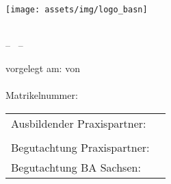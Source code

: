 \thispagestyle{empty}
\begingroup
{}
\begin{titlepage}
\begin{spacing}{1} %

	
	\vspace{1cm}
	\begin{center}
		\texttt{[image: assets/img/logo\_basn]} \\ 
	\end{center}

	\begin{center}
		\vspace{0.1cm}
		\LARGE \textbf{\myAcademy}\\
		\vspace{0.4cm}
		\Large -- \myStudy\ --
	\end{center}

	\vfill


	\vfill

	\begin{center}
		\Large \textbf{\myTitle}
		\ifdef{\mySubtitle}{\vspace{0.2cm}\\ \normalsize \mySubtitle}{}
	\end{center} 

	\vfill

	\begin{center}
		\large \myDegree
	\end{center}

	\vfill

	\begin{center}
		\large vorgelegt am: {\mySubmissionDate} von\\
		\vspace{0.3cm}
		\large \textbf{\myName}\\
		\vspace{0.3cm}
		\footnotesize Matrikelnummer: \myId
	\end{center}

	\vfill
	\vfill

	\begin{center}
		\begin{tabular}{ll}
		  Ausbildender Praxispartner:   & \myCompany\\
		                                & \myCompanyAddress\\
		  Begutachtung Praxispartner:   & \myExpert\\
		  Begutachtung BA Sachsen:      & \myProf
		\end{tabular}
	\end{center} 
\end{spacing}
\end{titlepage}
\restoregeometry
\thispagestyle{empty}

